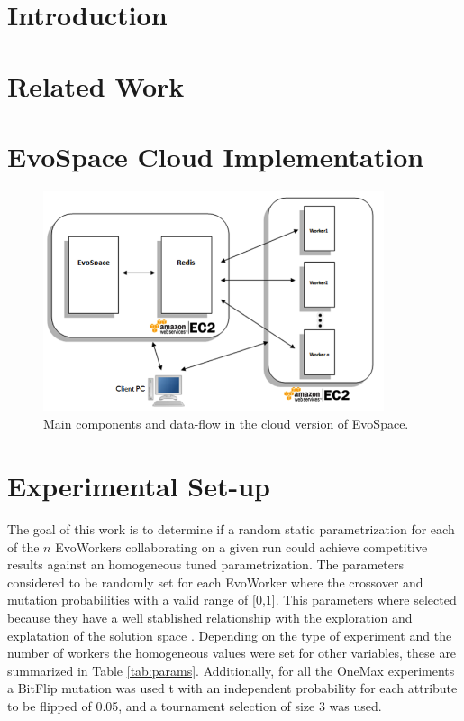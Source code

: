 \documentclass{llncs}
\begin{document}
\section{Introduction}

\section{Related Work}

\section{EvoSpace Cloud Implementation}
\begin{figure}[t]
    \centering
        \includegraphics[width=10cm]{img/evospace-aws.png}
    \caption{Main components and data-flow in the cloud version of EvoSpace. }
    \label{fig:evospace}
\end{figure}

\section{Experimental Set-up}
The goal of this work is to determine if a random static parametrization for each of the $n$ EvoWorkers 
collaborating on a given run could achieve competitive results against an homogeneous tuned parametrization.
The parameters considered to be randomly set for each EvoWorker where the crossover and mutation probabilities 
with a valid range of [0,1]. This parameters where selected because they have a well stablished relationship 
with the exploration and explatation of the solution space \cite{}. Depending on the type of experiment 
and the number of workers the homogeneous values were set for other variables, these are summarized
in Table \ref{tab:params}. Additionally, for all the OneMax experiments a BitFlip mutation was used t
with an independent probability for each attribute to be flipped of 0.05, and a tournament selection of size 3
was used.    
\end{document}
